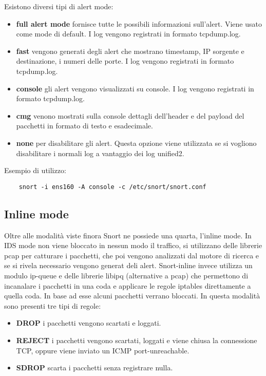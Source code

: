 Esistono diversi tipi di alert mode:

\begin{itemize}
    \item \textbf{full alert mode}  fornisce tutte le possibili informazioni sull'alert. Viene usato come mode di default. I log vengono registrati in formato tcpdump.log.
    \item \textbf{fast}  vengono generati degli alert che mostrano timestamp, IP sorgente e destinazione, i numeri delle porte. I log vengono registrati in formato tcpdump.log.
    \item \textbf{console} gli alert vengono visualizzati su console. I log vengono registrati in formato tcpdump.log.
    \item \textbf{cmg} venono mostrati sulla console dettagli dell'header e del payload del pacchetti in formato di testo e esadecimale.
    \item  \textbf{none} per disabilitare gli alert. Questa opzione viene utilizzata se si vogliono disabilitare i normali log a vantaggio dei log unified2.
\end{itemize}

Esempio di utilizzo:
\begin{verbatim}
    snort -i ens160 -A console -c /etc/snort/snort.conf
\end{verbatim}

\subsection{Inline mode}

Oltre alle modalità viste finora Snort ne possiede una quarta, l'inline mode. In IDS mode non viene bloccato in nessun modo il traffico, si utilizzano delle librerie pcap per catturare i pacchetti, che poi vengono analizzati dal motore di ricerca e se si rivela necessario vengono generat deli alert. Snort-inline invece utilizza un modulo ip-queue e delle librerie libipq (alternative a pcap) che permettono di incanalare i pacchetti in una coda e applicare le regole iptables direttamente a quella coda. In base ad esse alcuni pacchetti verrano bloccati. In questa modalità sono presenti tre tipi di regole:
\begin{itemize}
    \item \textbf{DROP} i pacchetti vengono scartati e loggati.
    \item \textbf{REJECT} i pacchetti vengono scartati, loggati e viene chiusa la connessione TCP, oppure viene inviato un ICMP port-unreachable.
    \item \textbf{SDROP} scarta i pacchetti senza registrare nulla.
\end{itemize}

